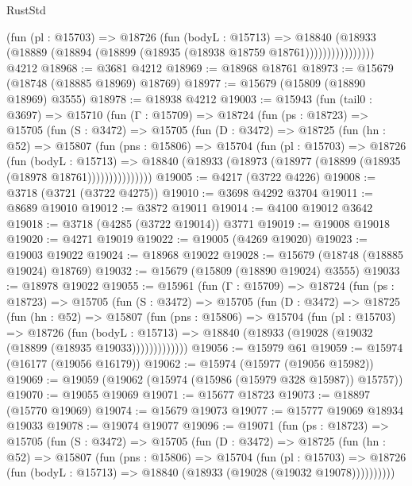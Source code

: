 \begin{lexlean}{RustStd}
\begin{coremodule}
                    (fun (pl : @15703) =>
                    @18726
                      (fun (bodyL : @15713) =>
                      @18840
                        (@18933
                          (@18889 (@18894 (@18899 (@18935 (@18938 @18759 @18761))))))))))))))))
    @4212
@18968 := @3681 @4212
@18969 := @18968 @18761
@18973 := @15679 (@18748 (@18885 @18969) @18769)
@18977 := @15679 (@15809 (@18890 @18969) @3555)
@18978 := @18938 @4212
@19003 := @15943
    (fun (tail0 : @3697) =>
    @15710
      (fun (Γ : @15709) =>
      @18724
        (fun (ps : @18723) =>
        @15705
          (fun (S : @3472) =>
          @15705
            (fun (D : @3472) =>
            @18725
              (fun (hn : @52) =>
              @15807
                (fun (pns : @15806) =>
                @15704
                  (fun (pl : @15703) =>
                  @18726
                    (fun (bodyL : @15713) =>
                    @18840 (@18933 (@18973 (@18977 (@18899 (@18935 (@18978 @18761)))))))))))))))
@19005 := @4217 (@3722 @4226)
@19008 := @3718 (@3721 (@3722 @4275))
@19010 := @3698 @4292 @3704
@19011 := @8689 @19010
@19012 := @3872 @19011
@19014 := @4100 @19012 @3642
@19018 := @3718 (@4285 (@3722 @19014)) @3771
@19019 := @19008 @19018
@19020 := @4271 @19019
@19022 := @19005 (@4269 @19020)
@19023 := @19003 @19022
@19024 := @18968 @19022
@19028 := @15679 (@18748 (@18885 @19024) @18769)
@19032 := @15679 (@15809 (@18890 @19024) @3555)
@19033 := @18978 @19022
@19055 := @15961
    (fun (Γ : @15709) =>
    @18724
      (fun (ps : @18723) =>
      @15705
        (fun (S : @3472) =>
        @15705
          (fun (D : @3472) =>
          @18725
            (fun (hn : @52) =>
            @15807
              (fun (pns : @15806) =>
              @15704
                (fun (pl : @15703) =>
                @18726
                  (fun (bodyL : @15713) =>
                  @18840 (@18933 (@19028 (@19032 (@18899 (@18935 @19033)))))))))))))
@19056 := @15979 @61
@19059 := @15974 (@16177 (@19056 @16179))
@19062 := @15974 (@15977 (@19056 @15982))
@19069 := @19059 (@19062 (@15974 (@15986 (@15979 @328 @15987)) @15757))
@19070 := @19055 @19069
@19071 := @15677 @18723
@19073 := @18897 (@15770 @19069)
@19074 := @15679 @19073
@19077 := @15777 @19069 @18934 @19033
@19078 := @19074 @19077
@19096 := @19071
    (fun (ps : @18723) =>
    @15705
      (fun (S : @3472) =>
      @15705
        (fun (D : @3472) =>
        @18725
          (fun (hn : @52) =>
          @15807
            (fun (pns : @15806) =>
            @15704
              (fun (pl : @15703) =>
              @18726 (fun (bodyL : @15713) => @18840 (@18933 (@19028 (@19032 @19078))))))))))

\end{coremodule}
\end{lexlean}
